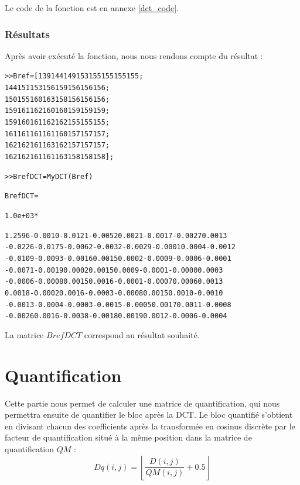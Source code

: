 \documentclass[a4paper, 12pt]{article}
\begin{document}
Le code de la fonction est en annexe \ref{dct_code}.

\subsubsection{R\'esultats}
\label{sec:Resultats}

Après avoir exécuté la fonction, nous nous rendons compte du résultat : 

\begin{alltt}
>> Bref=[	139 144 149 153 155 155 155 155;
					144 151 153 156 159 156 156 156;
					150 155 160 163 158 156 156 156;
					159 161 162 160 160 159 159 159;
					159 160 161 162 162 155 155 155;
					161 161 161 161 160 157 157 157;
					162 162 161 163 162 157 157 157;
					162 162 161 161 163 158 158 158];

>> BrefDCT = MyDCT(Bref)

BrefDCT =

   1.0e+03 *

 1.2596   -0.0010   -0.0121   -0.0052    0.0021   -0.0017   -0.0027    0.0013
-0.0226   -0.0175   -0.0062   -0.0032   -0.0029   -0.0001    0.0004   -0.0012
-0.0109   -0.0093   -0.0016    0.0015    0.0002   -0.0009   -0.0006   -0.0001
-0.0071   -0.0019    0.0002    0.0015    0.0009   -0.0001   -0.0000    0.0003
-0.0006   -0.0008    0.0015    0.0016   -0.0001   -0.0007    0.0006    0.0013
 0.0018   -0.0002    0.0016   -0.0003   -0.0008    0.0015    0.0010   -0.0010
-0.0013   -0.0004   -0.0003   -0.0015   -0.0005    0.0017    0.0011   -0.0008
-0.0026    0.0016   -0.0038   -0.0018    0.0019    0.0012   -0.0006   -0.0004
\end{alltt}

La matrice $BrefDCT$ correspond au résultat souhaité. \\



\section{Quantification}

Cette partie nous permet de calculer une matrice de quantification, qui nous permettra ensuite de quantifier le bloc après la DCT. Le bloc quantifié s'obtient en divisant chacun des coefficients après la transformée en cosinus discrète par le facteur de quantification situé à la même position dans la matrice de quantification $QM$ :
	\[ Dq(i,j) = \left\lfloor \frac{D(i,j)}{QM(i,j)} + 0.5 \right\rfloor
	\]
	
\end{document}
